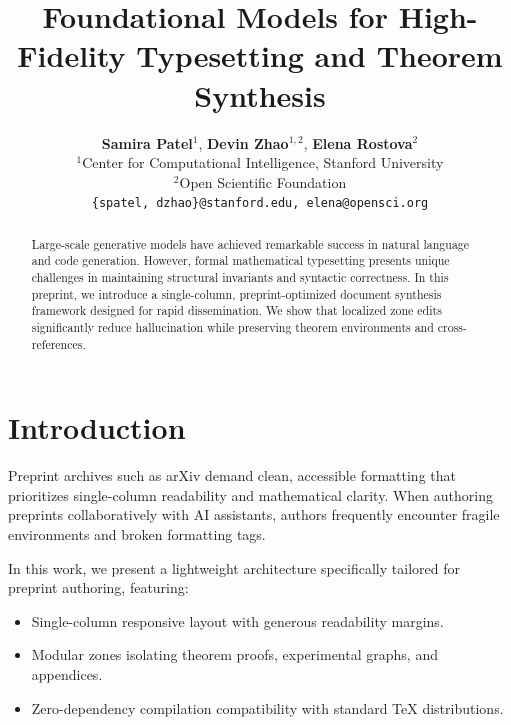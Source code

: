 \documentclass[11pt,a4paper]{article}
\begin{document}
\title{\textbf{Foundational Models for High-Fidelity Typesetting and Theorem Synthesis}}
\author{
  \textbf{Samira Patel}$^{1}$, \textbf{Devin Zhao}$^{1,2}$, \textbf{Elena Rostova}$^{2}$ \\
  $^{1}$Center for Computational Intelligence, Stanford University \\
  $^{2}$Open Scientific Foundation \\
  \texttt{\{spatel, dzhao\}@stanford.edu, elena@opensci.org}
}
\date{}
\maketitle

\begin{abstract}
Large-scale generative models have achieved remarkable success in natural language and code generation. However, formal mathematical typesetting presents unique challenges in maintaining structural invariants and syntactic correctness. In this preprint, we introduce a single-column, preprint-optimized document synthesis framework designed for rapid dissemination. We show that localized zone edits significantly reduce hallucination while preserving theorem environments and cross-references.
\end{abstract}

\section{Introduction}
Preprint archives such as arXiv demand clean, accessible formatting that prioritizes single-column readability and mathematical clarity. When authoring preprints collaboratively with AI assistants, authors frequently encounter fragile environments and broken formatting tags.

In this work, we present a lightweight architecture specifically tailored for preprint authoring, featuring:
\begin{itemize}
  \item Single-column responsive layout with generous readability margins.
  \item Modular zones isolating theorem proofs, experimental graphs, and appendices.
  \item Zero-dependency compilation compatibility with standard TeX distributions.
\end{itemize}
\end{document}
